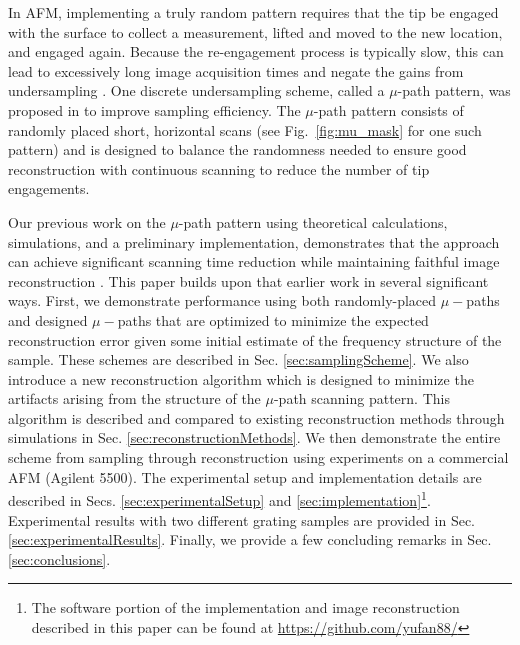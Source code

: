 \documentclass[twocolumn,twoside]{IEEEtran/IEEEtran}
\begin{document}
In AFM, implementing a truly random pattern requires that the tip be engaged
with the surface to collect a measurement, lifted and moved to the new location,
and engaged again. Because the re-engagement process is typically slow, this can
lead to excessively long image acquisition times and negate the gains from
undersampling \cite{andersson2012non}. One discrete undersampling scheme, called
a $\mu$-path pattern, was proposed in \cite{maxwell2014compressed} to improve
sampling efficiency. The $\mu$-path pattern consists of randomly placed short,
horizontal scans (see Fig.~\ref{fig:mu_mask} for one such pattern) and is
designed to balance the randomness needed to ensure good reconstruction with
continuous scanning to reduce the number of tip
engagements. %
	
Our previous work on the $\mu$-path pattern using theoretical calculations,
simulations, and a preliminary implementation, demonstrates that the approach
can achieve significant scanning time reduction while maintaining faithful image
reconstruction \cite{maxwell2014compressed,Luo:2015tu,Braker:2018gi}. This paper
builds upon that earlier work in several significant ways. First, we demonstrate
performance using both randomly-placed $\mu-$paths and designed $\mu-$paths that
are optimized to minimize the expected reconstruction error given some initial
estimate of the frequency structure of the sample. These schemes are described
in Sec. \ref{sec:samplingScheme}. We also introduce a new reconstruction
algorithm which is designed to minimize the artifacts arising from the structure
of the $\mu$-path scanning pattern. This algorithm is described and compared to
existing reconstruction methods through simulations in Sec.
\ref{sec:reconstructionMethods}. We then demonstrate the entire scheme from
sampling through reconstruction using experiments on a commercial AFM (Agilent
5500). The experimental setup and implementation details are described in Secs.
\ref{sec:experimentalSetup} and \ref{sec:implementation}\footnote{The software
  portion of the implementation and image reconstruction described in this paper
  can be found at \url{https://github.com/yufan88/}}. Experimental results with
two different grating samples are provided in Sec.
\ref{sec:experimentalResults}. Finally, we provide a few concluding remarks in
Sec. \ref{sec:conclusions}.


\end{document}
